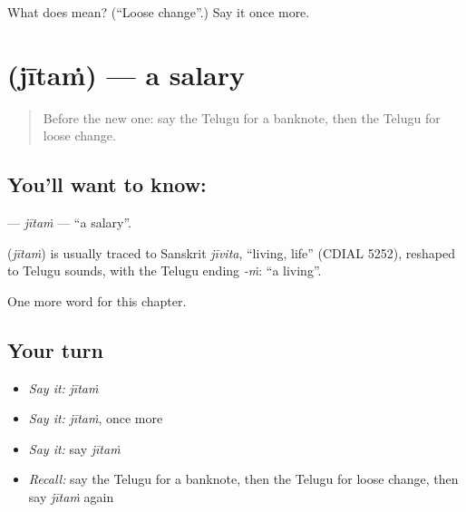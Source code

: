 \begin{tcolorbox}[breakable,colback=teal!4,colframe=teal!35!black,title={Before you move on}]
What does  mean? (\textquotedblleft{}Loose change\textquotedblright{}.) Say it once more.
\end{tcolorbox}
\section[\texorpdfstring{\te{జీతం} (jītaṁ)}{జీతం (jītaṁ)}]{ (jītaṁ) — a salary}

\label{lesson:TE-C235-jitam}



\begin{quote}
Before the new one: say the Telugu for a banknote, then the Telugu for loose change.
\end{quote}

\subsection*{You'll want to know: }
\textbf{} — \emph{jītaṁ} — \textquotedblleft{}a salary\textquotedblright{}.

\begin{cousinweb}
\textbf{} (\emph{jītaṁ}) is usually traced to Sanskrit \emph{jīvita}, \textquotedblleft{}living, life\textquotedblright{} (CDIAL 5252), reshaped to Telugu sounds, with the Telugu ending \emph{-ṁ}: \textquotedblleft{}a living\textquotedblright{}.
\end{cousinweb}

\begin{grammarlens}[title={What you've built}]
One more word for this chapter.
\end{grammarlens}

\subsection*{Your turn}
\begin{itemize}
\raggedright
  \item \emph{Say it:} \emph{jītaṁ}
  \item \emph{Say it:} \emph{jītaṁ}, once more
  \item \emph{Say it:} say \emph{jītaṁ}
  \item \emph{Recall:} say the Telugu for a banknote, then the Telugu for loose change, then say \emph{jītaṁ} again
\end{itemize}

